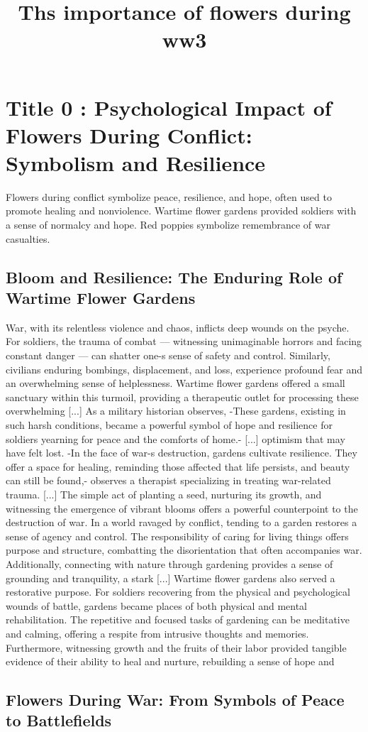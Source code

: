 \documentclass[12pt]{article}
\title{Ths importance of flowers during ww3}
\author{}
\date{}
\begin{document}
\maketitle

\section{Title 0 : Psychological Impact of Flowers During Conflict: Symbolism and  Resilience}
Flowers during conflict symbolize peace, resilience, and hope, often used to promote healing and nonviolence. Wartime flower gardens provided soldiers with a sense of normalcy and hope. Red poppies symbolize remembrance of war casualties.\subsection{Bloom and Resilience: The Enduring Role of Wartime Flower Gardens}
War, with its relentless violence and chaos, inflicts deep wounds on the psyche. For soldiers, the trauma of combat --- witnessing unimaginable horrors and facing constant danger --- can shatter one-s sense of safety and control. Similarly, civilians enduring bombings, displacement, and loss, experience profound fear and an overwhelming sense of helplessness. Wartime flower gardens offered a small sanctuary within this turmoil, providing a therapeutic outlet for processing these overwhelming [...] As a military historian observes, -These gardens, existing in such harsh conditions, became a powerful symbol of hope and resilience for soldiers yearning for peace and the comforts of home.- [...] optimism that may have felt lost. -In the face of war-s destruction, gardens cultivate resilience. They offer a space for healing, reminding those affected that life persists, and beauty can still be found,- observes a therapist specializing in treating war-related trauma. [...] The simple act of planting a seed, nurturing its growth, and witnessing the emergence of vibrant blooms offers a powerful counterpoint to the destruction of war. In a world ravaged by conflict, tending to a garden restores a sense of agency and control. The responsibility of caring for living things offers purpose and structure, combatting the disorientation that often accompanies war. Additionally, connecting with nature through gardening provides a sense of grounding and tranquility, a stark [...] Wartime flower gardens also served a restorative purpose. For soldiers recovering from the physical and psychological wounds of battle, gardens became places of both physical and mental rehabilitation. The repetitive and focused tasks of gardening can be meditative and calming, offering a respite from intrusive thoughts and memories. Furthermore, witnessing growth and the fruits of their labor provided tangible evidence of their ability to heal and nurture, rebuilding a sense of hope and\subsection{Flowers During War: From Symbols of Peace to Battlefields}
\end{document}
